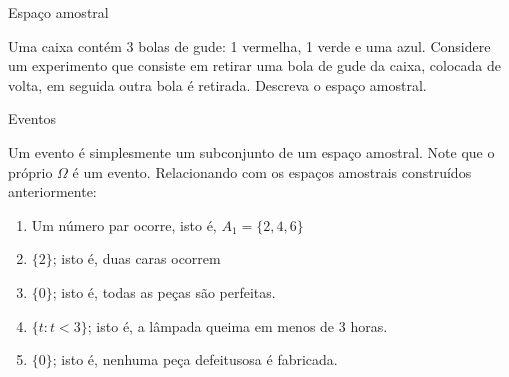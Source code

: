\begin{frame}{Espaço amostral}
    \begin{exemplo}
        Uma caixa contém 3 bolas de gude: 1 vermelha, 1 verde e uma azul. Considere um experimento que consiste em retirar uma bola de gude da caixa, colocada de volta, em seguida outra bola é retirada. Descreva o espaço amostral.
    \end{exemplo}
\end{frame}
\begin{frame}{Eventos}

Um evento é simplesmente um subconjunto de um espaço amostral. Note que o próprio $\Omega$ é um evento. Relacionando com os espaços amostrais construídos anteriormente:

\begin{exemplo}
    \begin{enumerate}
        \item Um número par ocorre, isto é, $A_1= \{2,4,6\}$
        \pause
        \item $\{2\}$; isto é, duas caras ocorrem
        \pause
        \item $\{0\}$; isto é, todas as peças são perfeitas.
        \pause
        \item $\{t : t < 3\}$; isto é, a lâmpada queima em menos de 3 horas.
        \pause
        \item $\{0\}$; isto é, nenhuma peça defeitusosa é fabricada. 
    \end{enumerate}
\end{exemplo}
    
\end{frame}

